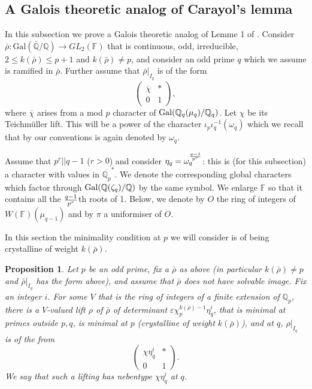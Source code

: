 \documentclass[12pt]{amsart}
\newcommand{\Q}{\mathbb{Q}}
\newcommand{\aQp}{\overline{\mathbb{Q}_{p}}}
\newcommand{\rhobar}{\overline{\rho}}
\newtheorem{prop}[theorem]{Proposition}
\def\rhobar{ {\bar {\rho} } }
\def\rhob{ {\bar {\rho} } }
\newcommand{\Galois}{\mathrm{Gal}}
\newcommand{\Gal}{\Galois( \bar{ {\mathbb Q}}/{\mathbb Q})}
\newcommand{\F}{{\mathbb F}}
\newcommand{\vep}{{\varepsilon}}
\begin{document}
\subsection{A Galois theoretic analog of Carayol's lemma}\label{type}

In this subsection we prove a Galois theoretic analog of Lemme 1 of \cite{car}.
Consider $\rhob: \Gal \rightarrow GL_2(\F)$ that is continuous, odd, irreducible,  $2 \leq k(\rhobar) \leq p+1$ and $k(\rhobar) \neq p$, 
and consider an odd prime $q$ which we assume is ramified in
$\rhob$.
Further assume that $\rhob|_{I_q}$ is of the form
$$\left( \begin{array}{cc}
    \overline \chi  & *  \\
    0 & 1
\end{array} \right),$$ where $\overline \chi$ arises from a mod $p$ character of ${\rm Gal}(\Q_q(\mu_q)/\Q_q)$.
Let $\chi$ be its Teichm\"uller lift. This will be a power of the character $\iota_p\iota_q^{-1}(\omega_q)$
which we recall that by our conventions is again denoted by $\omega_q$.


Assume that $p^r||q-1$ ($r>0$) and consider $\eta_q=\omega_q^{ {q-1} \over p^r }$: this is (for this subsection)
 a character with values in $\aQp^*$.
We denote the corresponding global characters which factor through
${\rm Gal}(\Q(\zeta_q)/\Q)$ by the same symbol. We enlarge $\F$ so that it contains all the ${q-1} \over p^r$th roots of 1.
Below, we denote by $O$ the ring of integers of $W(\F)(\mu_{q-1})$ and by $\pi$ a uniformiser of $O$.

In this section the minimality condition at $p$ we will consider
is of being crystalline of weight $k(\rhobar)$.

\begin{prop}\label{q}
  Let $p$ be an odd prime, fix a $\rhob$ as above (in particular $k(\rhobar)\neq     p$ and $\rhobar|_{I_q}$ has the form above), and assume that $\rhob$ does not have solvable
image. Fix an integer $i$. For some $V$ that is the ring of 
integers of a finite extension of $\Q_p$, there is a $V$-valued lift $\rho$ of $\rhob$ of determinant
$\vep\chi_p^{k(\rhobar)-1}\eta_q^i$, that is minimal at primes outside $p,q$, is minimal
at $p$ (crystalline of weight $k(\rhobar)$), and at $q$, $\rho|_{I_q}$ is of the from
$$\left( \begin{array}{cc}
     \chi \eta_q^i  & *  \\
    0 & 1
\end{array} \right).$$ We say that such a lifting has nebentype $\chi \eta_q^i$ at $q$.
\end{prop}
\end{document}
